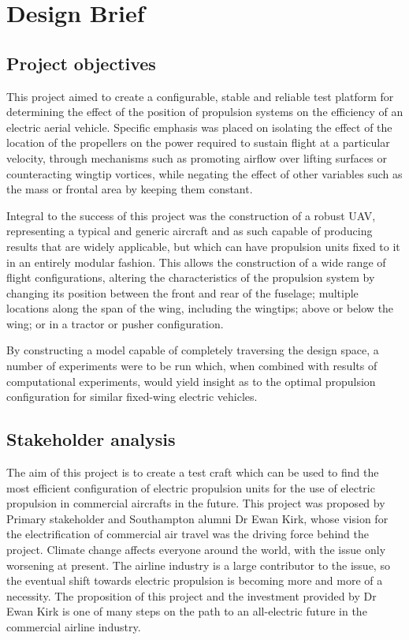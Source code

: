 \documentclass[../../main.tex]{subfiles}
\begin{document}
\chapter{Design Brief} \label{chapter:design-brief}

\section{Project objectives} \label{section:design-brief:project-objectives}

This project aimed to create a configurable, stable and reliable test platform for determining the effect of the position of propulsion systems on the efficiency of an electric aerial vehicle.
Specific emphasis was placed on isolating the effect of the location of the propellers on the power required to sustain flight at a particular velocity, through mechanisms such as promoting airflow over lifting surfaces or counteracting wingtip vortices, while negating the effect of other variables such as the mass or frontal area by keeping them constant. 

Integral to the success of this project was the construction of a robust UAV, representing a typical and generic aircraft and as such capable of producing results that are widely applicable, but which can have propulsion units fixed to it in an entirely modular fashion.
This allows the construction of a wide range of flight configurations, altering the characteristics of the propulsion system by changing its position between the front and rear of the fuselage; multiple locations along the span of the wing, including the wingtips; above or below the wing; or in a tractor or pusher configuration. 

By constructing a model capable of completely traversing the design space, a number of experiments were to be run which, when combined with results of computational experiments, would yield insight as to the optimal propulsion configuration for similar fixed-wing electric vehicles. 

\section{Stakeholder analysis} \label{section:design-brief:stakeholder-analysis}


The aim of this project is to create a test craft which can be used to find the most efficient configuration of electric propulsion units for the use of electric propulsion in commercial aircrafts in the future.
This project was proposed by Primary stakeholder and Southampton alumni Dr Ewan Kirk, whose vision for the electrification of commercial air travel was the driving force behind the project.
Climate change affects everyone around the world, with the issue only worsening at present.
The airline industry is a large contributor to the issue, so the eventual shift towards electric propulsion is becoming more and more of a necessity.
The proposition of this project and the investment provided by Dr Ewan Kirk is one of many steps on the path to an all-electric future in the commercial airline industry.  
\end{document}
